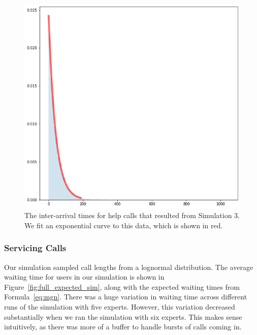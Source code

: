 \begin{figure}[H]
  \includegraphics[width=\textwidth]{figures/montecarlo/call_times.png}
  \caption{
    The inter-arrival times for help calls that resulted from Simulation 3.
    We fit an exponential curve to this data, which is shown in red.
  }\label{fig:step_patience}
\end{figure}

\subsubsection{Servicing Calls}

Our simulation sampled call lengths from a lognormal distribution.
The average waiting time for users in our simulation is shown in
Figure~\ref{fig:full_expected_sim}, along with the expected waiting times from
Formula~\ref{eq:mgn}.
There was a huge variation in waiting time across different runs of the
simulation with five experts.
However, this variation decreased substantially when we ran the simulation with
six experts.
This makes sense intuitively, as there was more of a buffer to handle bursts of
calls coming in.

